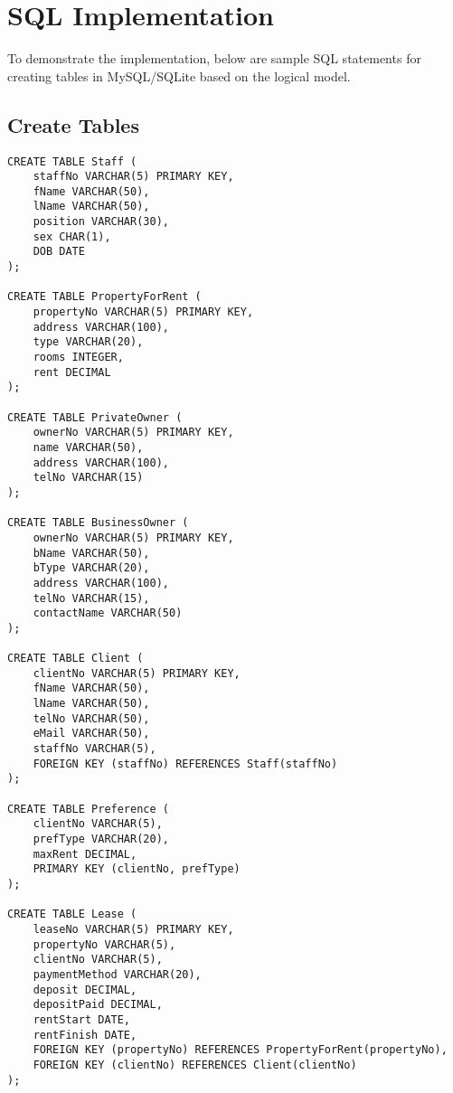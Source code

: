 \documentclass[a4paper,12pt]{article}
\begin{document}
\section*{SQL Implementation}

To demonstrate the implementation, below are sample SQL statements for creating tables in MySQL/SQLite based on the logical model.

\subsection*{Create Tables}

\begin{verbatim}
CREATE TABLE Staff (
    staffNo VARCHAR(5) PRIMARY KEY,
    fName VARCHAR(50),
    lName VARCHAR(50),
    position VARCHAR(30),
    sex CHAR(1),
    DOB DATE
);

CREATE TABLE PropertyForRent (
    propertyNo VARCHAR(5) PRIMARY KEY,
    address VARCHAR(100),
    type VARCHAR(20),
    rooms INTEGER,
    rent DECIMAL
);

CREATE TABLE PrivateOwner (
    ownerNo VARCHAR(5) PRIMARY KEY,
    name VARCHAR(50),
    address VARCHAR(100),
    telNo VARCHAR(15)
);

CREATE TABLE BusinessOwner (
    ownerNo VARCHAR(5) PRIMARY KEY,
    bName VARCHAR(50),
    bType VARCHAR(20),
    address VARCHAR(100),
    telNo VARCHAR(15),
    contactName VARCHAR(50)
);

CREATE TABLE Client (
    clientNo VARCHAR(5) PRIMARY KEY,
    fName VARCHAR(50),
    lName VARCHAR(50),
    telNo VARCHAR(50),
    eMail VARCHAR(50),
    staffNo VARCHAR(5),
    FOREIGN KEY (staffNo) REFERENCES Staff(staffNo)
);

CREATE TABLE Preference (
    clientNo VARCHAR(5),
    prefType VARCHAR(20),
    maxRent DECIMAL,
    PRIMARY KEY (clientNo, prefType)
);

CREATE TABLE Lease (
    leaseNo VARCHAR(5) PRIMARY KEY,
    propertyNo VARCHAR(5),
    clientNo VARCHAR(5),
    paymentMethod VARCHAR(20),
    deposit DECIMAL,
    depositPaid DECIMAL,
    rentStart DATE,
    rentFinish DATE,
    FOREIGN KEY (propertyNo) REFERENCES PropertyForRent(propertyNo),
    FOREIGN KEY (clientNo) REFERENCES Client(clientNo)
);
\end{verbatim}
\end{document}
